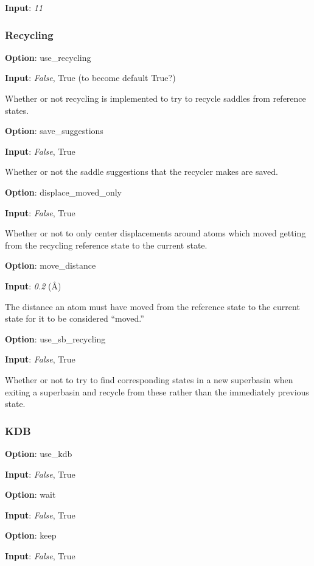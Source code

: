 \documentclass{article}
\begin{document}
\noindent\textbf{Input}:  \emph{11}

\subsubsection{Recycling}

\noindent\textbf{Option}:  use\_recycling

\noindent\textbf{Input}:  \emph{False}, True (to become default True?)

Whether or not recycling is implemented to try to recycle saddles from reference states.

\noindent\textbf{Option}:  save\_suggestions

\noindent\textbf{Input}:  \emph{False}, True

Whether or not the saddle suggestions that the recycler makes are saved.

\noindent\textbf{Option}:  displace\_moved\_only

\noindent\textbf{Input}:  \emph{False}, True

Whether or not to only center displacements around atoms which moved getting from the recycling reference state to the current state.

\noindent\textbf{Option}:  move\_distance

\noindent\textbf{Input}:  \emph{0.2} (\AA)

The distance an atom must have moved from the reference state to the current state for it to be considered ``moved.''

\noindent\textbf{Option}:  use\_sb\_recycling

\noindent\textbf{Input}:  \emph{False}, True

Whether or not to try to find corresponding states in a new superbasin when exiting a superbasin and recycle from these rather than the immediately previous state.

\subsubsection{KDB}

\noindent\textbf{Option}:  use\_kdb

\noindent\textbf{Input}:  \emph{False}, True

\noindent\textbf{Option}:  wait

\noindent\textbf{Input}:  \emph{False}, True

\noindent\textbf{Option}:  keep

\noindent\textbf{Input}:  \emph{False}, True
\end{document}
